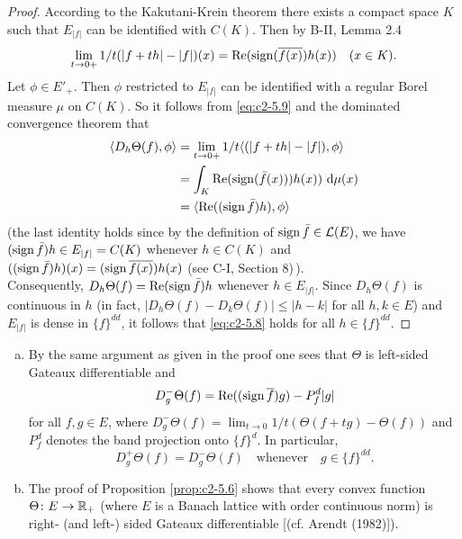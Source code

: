 \begin{proof}
According to the Kakutani-Krein theorem there exists a compact space
$K$ such that $E_{|f|}$ can be identified with $C(K)$. Then by B-II,
Lemma 2.4
\begin{equation}\label{eq:c2-5.9}
\lim_{t \to 0+} 1/t(|f+th| - |f|)(x) = \mathop{}\!\mathrm{Re}(\operatorname{sign} (\overline{f(x)})h(x)) \quad (x \in K).
\end{equation}
Let $\phi \in E'_{+}$. Then $\phi$ restricted to $E_{|f|}$ can be identified with a regular Borel measure $\mu$ on $C(K)$.
So it follows from \eqref{eq:c2-5.9} and the dominated convergence theorem that
\begin{align*}
\langle D_{h}\Theta(f),\phi \rangle &= \lim_{t \to 0+} 1/t \langle(|f + th| - |f|),\phi \rangle\\
&= \int_{K} \mathop{}\!\mathrm{Re}(\operatorname{sign} (\bar{f}(x)))h(x)) \, \mathop{}\!\mathrm{d}{\mu(x)} \\
&= \langle\mathop{}\!\mathrm{Re}((\operatorname{sign}  \bar{f})h),\phi\rangle
\end{align*}
(the last identity holds since by the definition of $\operatorname{sign}  \bar{f} \in \mathcal{L}(E)$,
we have $(\operatorname{sign}  \bar{f})h \in E_{|f|} = C(K)$ whenever $h \in C(K)$ and
$
((\operatorname{sign}  \bar{f})h)(x) = (\operatorname{sign}  \overline{f(x)})h(x)
$  
(see C-I, Section 8)\,).\\
Consequently, $D_{h}\Theta(f) = \mathop{}\!\mathrm{Re}(\operatorname{sign}  \bar{f})h$ whenever $h \in E_{|f|}$. 
Since $D_{h}\Theta(f)$ is continuous in $h$ (in fact, $|D_{h}\Theta(f) - D_{k}\Theta(f)| \leq |h - k|$ for all $h,k \in E$) and $E_{|f|}$ is dense in $\{f\}^{dd}$, it follows that \eqref{eq:c2-5.8} holds for all $h \in \{f\}^{dd}$.
\end{proof}

\begin{remark}\label{rem:c2-5.7}%
\begin{enumerate}[a), wide, labelsep=.5em] %
\item \label{rem:c2-5.7-1}
By the same argument as given in the proof one sees
that $\Theta$ is left-sided Gateaux differentiable and
\begin{equation*}
D^{-}_{g}\Theta(f) = \mathop{}\!\mathrm{Re}((\operatorname{sign}  \overline{f})g) - P^{d}_{f}|g|
\end{equation*}
for all $f, g \in E$, where $D^{-}_{g}\Theta(f) = \lim_{t \to 0} 1/t(\Theta(f + tg) - \Theta(f))$ and
$P^{d}_{f}$ denotes the band projection onto $\{f\}^{d}$. 
In particular,
\begin{equation}\label{eq:c2-5.10}
D^{+}_{g}\Theta(f) = D^{-}_{g}\Theta(f) \quad \text{whenever} \quad g \in \{f\}^{dd}.
\end{equation}
\item \label{rem:c2-5.7-2}
The proof of  Proposition \ref{prop:c2-5.6}   shows that every convex function $\Theta \colon E \to \mathbb{R}_{+}$
(where $E$ is a Banach lattice with order continuous norm) is right- (and left-) sided Gateaux differentiable [(cf. Arendt (1982)]).
\end{enumerate}
\end{remark}


